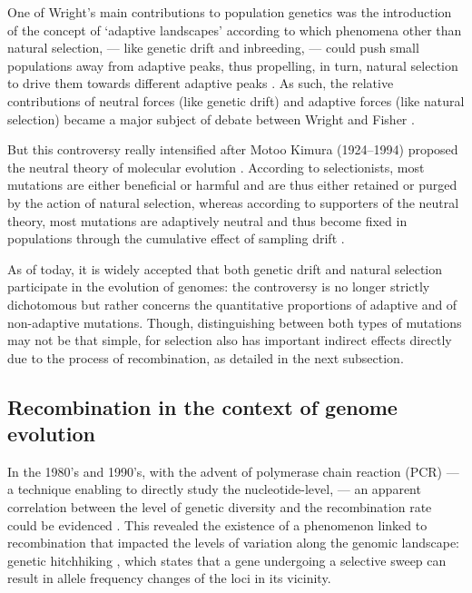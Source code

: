 One of Wright's main contributions to population genetics was the introduction of the concept of ‘adaptive landscapes’ according to which phenomena other than natural selection, — like genetic drift and inbreeding, — could push small populations away from adaptive peaks, thus propelling, in turn, natural selection to drive them towards different adaptive peaks \citep{wright1932roles}.
As such, the relative contributions of neutral forces (like genetic drift) and adaptive forces (like natural selection) became a major subject of debate between Wright and Fisher \citep{plutynski2007drift}.

But this controversy really intensified after Motoo Kimura (1924--1994) proposed the neutral theory of molecular evolution \citep{kimura1968evolutionary,kimura1991neutral,kimura1986dna}.
According to selectionists, most mutations are either beneficial or harmful and are thus either retained or purged by the action of natural selection, whereas according to supporters of the neutral theory, most mutations are adaptively neutral and thus become fixed in populations through the cumulative effect of sampling drift \citep{lewin1996patterns}.

As of today, it is widely accepted that both genetic drift and natural selection participate in the evolution of genomes: the controversy is no longer strictly dichotomous but rather concerns the quantitative proportions of adaptive and of non-adaptive mutations.
Though, distinguishing between both types of mutations may not be that simple, for selection also has important indirect effects directly due to the process of recombination, as detailed in the next subsection.



\subsection{Recombination in the context of genome evolution}

In the 1980's and 1990's, with the advent of polymerase chain reaction (PCR) — a technique enabling to directly study the nucleotide-level, — an apparent correlation between the level of genetic diversity and the recombination rate could be evidenced \citep{begun1992levels}.
This revealed the existence of a phenomenon linked to recombination that impacted the levels of variation along the genomic landscape: genetic hitchhiking \citep{smith1974hitchhiking}, which states that a gene undergoing a selective sweep can result in allele frequency changes of the loci in its vicinity.

